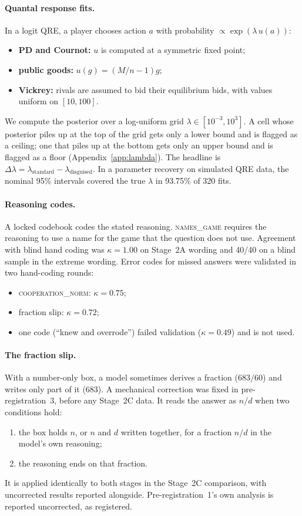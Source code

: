\documentclass[11pt]{article}
\theoremstyle{definition}
\theoremstyle{remark}
\newcommand{\lam}{\lambda}
\begin{document}
\paragraph{Quantal response fits.} In a logit QRE, a player chooses action $a$ with probability
$\propto \exp(\lam\,u(a))$:
\begin{itemize}
\item \textbf{PD and Cournot:} $u$ is computed at a symmetric fixed point;
\item \textbf{public goods:} $u(g) = (M/n-1)g$;
\item \textbf{Vickrey:} rivals are assumed to bid their equilibrium bids, with values uniform
  on $[10,100]$.
\end{itemize}
We compute the posterior over a log-uniform grid $\lam \in [10^{-3},10^3]$. A cell whose posterior
piles up at the top of the grid gets only a lower bound and is flagged as a ceiling; one that
piles up at the bottom gets only an upper bound and is flagged as a floor
(Appendix~\ref{app:lambda}).
The headline is $\Delta\lam = \lam_{\text{standard}} - \lam_{\text{disguised}}$. In a parameter
recovery on simulated QRE data, the nominal 95\% intervals covered the true $\lam$ in 93.75\% of
320 fits.

\paragraph{Reasoning codes.} A locked codebook codes the stated reasoning. \textsc{names\_game}
requires the reasoning to use a name for the game that the question does not use. Agreement with
blind hand coding was $\kappa=1.00$ on Stage~2A wording and 40/40 on a blind sample in the
extreme wording. Error codes for missed answers were validated in two hand-coding rounds:
\begin{itemize}
\item \textsc{cooperation\_norm}: $\kappa=0.75$;
\item fraction slip: $\kappa=0.72$;
\item one code (``knew and overrode'') failed validation ($\kappa=0.49$) and is not used.
\end{itemize}

\paragraph{The fraction slip.} With a number-only box, a model sometimes derives a fraction
($683/60$) and writes only part of it (683). A mechanical correction was fixed in
pre-registration~3, before any Stage~2C data. It reads the answer as $n/d$ when two conditions
hold:
\begin{enumerate}
\item the box holds $n$, or $n$ and $d$ written together, for a fraction $n/d$ in the model's own
  reasoning;
\item the reasoning ends on that fraction.
\end{enumerate}
It is applied identically to both stages in the Stage~2C comparison, with uncorrected results
reported alongside. Pre-registration~1's own analysis is reported uncorrected, as registered.
\end{document}
